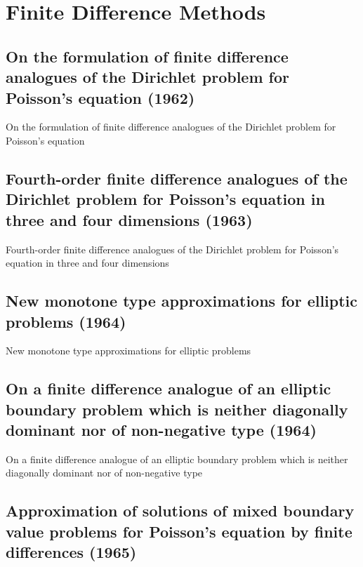 \chapter{Finite Difference Methods}

\section{On the formulation of finite difference analogues of the Dirichlet problem for Poisson's equation (1962)}
On the formulation of finite difference analogues of the Dirichlet problem for Poisson's equation \cite{bramble1962formulation}


\section{Fourth-order finite difference analogues of the Dirichlet problem for Poisson's equation in three and four dimensions (1963)}
Fourth-order finite difference analogues of the Dirichlet problem for Poisson's equation in three and four dimensions \cite{bramble1963fourth}




\section{New monotone type approximations for elliptic problems (1964)}
New monotone type approximations for elliptic problems\cite{bramble1964new}


\section{On a finite difference analogue of an elliptic boundary problem which is neither diagonally dominant nor of non-negative type (1964)}

On a finite difference analogue of an elliptic boundary problem which is neither diagonally dominant nor of non-negative type \cite{bramble1964finite}



\section{Approximation of solutions of mixed boundary value problems for Poisson's equation by finite differences (1965)}

